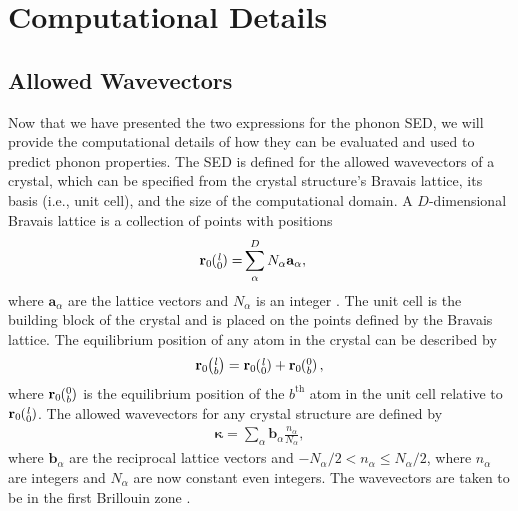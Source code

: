 \section{\label{Section_Comp}Computational Details}
\subsection{\label{Subsection_Comp_Details_1}Allowed Wavevectors}
Now that we have presented the two expressions for the phonon SED, we will 
provide the computational details of how they can be evaluated and used 
to predict 
phonon properties. The SED is defined for the allowed wavevectors of a 
crystal, which can 
be specified from the crystal structure's Bravais lattice, its basis (i.e., 
unit cell), and 
the size of the computational domain. A $D$-dimensional Bravais lattice 
is a collection of 
points with
positions
\begin{equation}\label{crys_pos}
\begin{split}
\mathbf{r}_0\ab{l}{0} =& \sum^D_{\alpha} N_{\alpha}\mathbf{a}_{\alpha},
\end{split}
\end{equation}
where $\mathbf{a}_{\alpha}$ are the lattice vectors and $N_{\alpha}$ is 
an integer 
\cite{dove_introduction_1993}. The unit cell is the building block of 
the crystal and is placed on the 
points defined by the Bravais lattice. The equilibrium position of any 
atom in the crystal 
can be described by
\begin{equation}\label{crys_pos2}
\begin{split}
\mathbf{r}_0\ab{l}{b} = \mathbf{r}_0\ab{l}{0} + \mathbf{r}_0\ab{0}{b},
\end{split}
\end{equation}
where $\mathbf{r}_0\ab{0}{b}$ is the equilibrium position of the 
$b^{\textrm{th}}$ atom in 
the unit cell relative to $\mathbf{r}_0\ab{l}{0}$. The allowed wavevectors 
for any crystal 
structure are defined by
\begin{equation}\label{crys_pos3}
\begin{split}
\pmb{\kappa} = \sum_{\alpha} \mathbf{b}_{\alpha} 
\frac{n_{\alpha}}{N_{\alpha}},
\end{split}
\end{equation}
where $\mathbf{b}_{\alpha}$ are the reciprocal lattice vectors and 
$-N_{\alpha}/2 < 
n_{\alpha} \leq N_{\alpha}/2$, where $n_{\alpha}$ are integers and 
$N_{\alpha}$ are now 
constant even integers. The wavevectors are taken to be in the first 
Brillouin zone 
\cite{ashcroft_solid_1976}.

